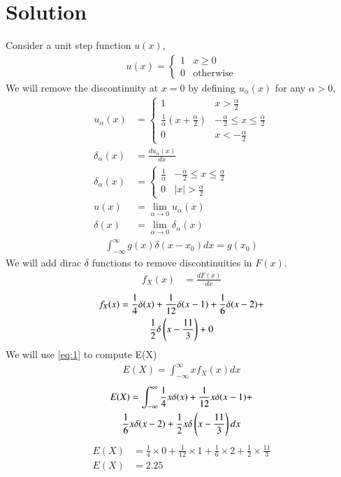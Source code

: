 \documentclass[journal,12pt,twocolumn]{IEEEtran}
\begin{document}
\section*{Solution}
Consider a unit step function $u(x)$,
\begin{align}
u(x) = 
    \begin{cases}
        1 & x \geq 0 \\
        0 & \text{otherwise}
    \end{cases}
\end{align}
We will remove the discontinuity at $x=0$ by defining $u_{\alpha}(x)$ for any $\alpha > 0$,
\begin{align}
u_{\alpha}(x) &= 
    \begin{cases}
        1 & x > \frac{\alpha}{2} \\
        \frac{1}{\alpha}(x + \frac{\alpha}{2}) & -\frac{\alpha}{2} \leq x \leq \frac{\alpha}{2} \\
        0 & x < -\frac{\alpha}{2}
    \end{cases}\\
\delta_{\alpha}(x) &= \frac{du_{\alpha}(x)}{dx}\\
\delta_{\alpha}(x) &=
    \begin{cases}
        \frac{1}{\alpha} & -\frac{\alpha}{2} \leq x \leq \frac{\alpha}{2} \\
        0 & |x| > \frac{\alpha}{2}
    \end{cases}\\
u(x) &= \lim_{\alpha \to 0} u_{\alpha}(x)\\
\delta (x) &= \lim_{\alpha \to 0} \delta_{\alpha}(x)
\end{align}
\begin{align}
    \int_{-\infty}^{\infty}g(x)\delta(x-x_0)dx = g(x_0) \label{eq:1}
\end{align}
We will add dirac $\delta$ functions to remove discontinuities in $F(x)$.
\begin{align}
    f_{X}(x) &= \frac{dF(x)}{dx}
\end{align}
\begin{multline}
    f_{X}(x) = \frac{1}{4}\delta(x) + \frac{1}{12}\delta(x - 1) + \frac{1}{6}\delta(x-2) +\\ \frac{1}{2}\delta\left(x-\frac{11}{3}\right) + 0
\end{multline}
We will use \eqref{eq:1} to compute E(X)
\begin{align}
    E(X) = \int_{-\infty}^{\infty}xf_X(x)dx
\end{align}
\begin{multline}
    E(X) = \int_{-\infty}^{\infty}\frac{1}{4}x\delta(x) + \frac{1}{12}x\delta(x - 1) +\\ \frac{1}{6}x\delta(x-2) + \frac{1}{2}x\delta\left(x-\frac{11}{3}\right)dx
\end{multline}
\begin{align}
    E(X) &= {\frac{1}{4}}\times 0 + {\frac{1}{12}}\times 1 + {\frac{1}{6}}\times 2 + {\frac{1}{2}}\times{\frac{11}{3}}\\
    E(X) &= 2.25
\end{align}
\end{document}
